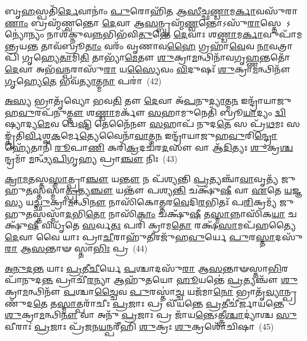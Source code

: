{\anuvakamend[{\-\ul{𑌮}\-\-\ul{𑌨𑍁}\-\-\ul{𑌷𑍍𑌯}\-\-\ul{𑌚}\-𑌰𑌾𑌵𑍁᳴𑌦\-\ul{𑌪𑌾}\-𑌤𑍍𑌰𑌮𑍁᳴\-\ul{𑌪}\-𑌹𑍍𑌵𑌯𑍇᳴𑌤 𑌦𑍍𑌵𑌿𑌦𑍇\-\ul{𑌵}\-𑌤𑍍𑌯𑌾𑌃॑ 𑌷𑌟𑍍𑌚᳴𑌤𑍍𑌵𑌾𑌰𑌿𑍞𑌶𑌚𑍍𑌚}]}%

𑌬𑍃\-\ul{𑌹}\-𑌸𑍍𑌪𑌤𑌿᳴\-\ul{𑌰𑍍𑌦𑍇}\-𑌵𑌾𑌨𑌾𑌂॑ \ul{𑌪𑍁}\-𑌰𑍋𑌹𑌿᳴\-\ul{𑌤} 𑌆\-\ul{𑌸𑍀}\-𑌚𑍍𑌛\-\ul{𑌣𑍍𑌡𑌾}\-𑌮\-\ul{𑌰𑍍𑌕𑌾}\-𑌵𑌸𑍁᳴𑌰𑌾\-\ul{𑌣𑌾𑌂} 𑌬𑍍𑌰𑌹𑍍𑌮᳴𑌣𑍍𑌵𑌨𑍍𑌤𑍋 \ul{𑌦𑍇}\-𑌵𑌾 𑌆\-\ul{𑌸}\-𑌨𑍍𑌬𑍍𑌰𑌹𑍍𑌮᳴\-\ul{𑌣𑍍𑌵}\-𑌨𑍍𑌤𑍋\-𑌽𑌸𑍁᳴\-\ul{𑌰𑌾}\-𑌸𑍍𑌤𑍇 \-𑌽𑌨𑍍𑌯𑍋॑𑌨𑍍𑌯𑌂 𑌨𑌾𑌶᳴𑌕𑍍𑌨𑍁𑌵\-\ul{𑌨𑍍𑌨}\-𑌭𑌿𑌭᳴𑌵𑌿\-\ul{𑌤𑍁}\-𑌨𑍍𑌤𑍇 \ul{𑌦𑍇}\-𑌵𑌾𑌃 𑌶\-\ul{𑌣𑍍𑌡𑌾}\-𑌮\-\ul{𑌰𑍍𑌕𑌾}\-𑌵𑍁𑌪𑌾᳴𑌮𑌨𑍍𑌤𑍍𑌰𑌯\-\ul{𑌨𑍍𑌤} 𑌤𑌾𑌵᳴𑌬𑍍𑌰𑍂\-\ul{𑌤𑌾𑌂} 𑌵𑌰𑌂᳴ 𑌵𑍃𑌣𑌾𑌵\-\ul{𑌹𑍈} 𑌗𑍍𑌰𑌹𑌾᳴\-\ul{𑌵𑍇}\-𑌵 \ul{𑌨𑌾}\-𑌵𑌤𑍍𑌰𑌾𑌪𑌿᳴ 𑌗𑍃𑌹𑍍𑌯𑍇\-\ul{𑌤𑌾}\-𑌮𑌿\-\ul{𑌤𑌿} 𑌤𑌾𑌭𑍍𑌯𑌾᳴\-\ul{𑌮𑍇}\-𑌤𑍗 \ul{𑌶𑍁}\-𑌕𑍍𑌰𑌾\-\ul{𑌮}\-𑌨𑍍𑌥𑌿𑌨𑌾᳴𑌵𑌗𑍃\-\ul{𑌹𑍍𑌣}\-𑌨𑍍𑌤𑌤𑍋᳴ \ul{𑌦𑍇}\-𑌵𑌾 𑌅𑌭᳴\-\ul{𑌵}\-𑌨𑍍𑌪𑌰𑌾𑌸𑍁᳴\-\ul{𑌰𑌾} 𑌯\-\ul{𑌸𑍍𑌯𑍈}\-𑌵𑌂 \ul{𑌵𑌿}\-𑌦𑍁𑌷𑌃᳴ \ul{𑌶𑍁}\-𑌕𑍍𑌰𑌾\-\ul{𑌮}\-𑌨𑍍𑌥𑌿𑌨𑍗᳴ \ul{𑌗𑍃}\-𑌹𑍍𑌯𑍇\-\ul{𑌤𑍇} 𑌭𑌵᳴\-\ul{𑌤𑍍𑌯𑌾}\-𑌤𑍍𑌮\-\ul{𑌨𑌾} 𑌪𑌰𑌾॑~(42)

\-\ul{𑌅}\-\-\ul{𑌸𑍍𑌯} 𑌭𑍍𑌰𑌾𑌤𑍃᳴𑌵𑍍𑌯𑍋 𑌭𑌵\-\ul{𑌤𑌿} 𑌤𑍗 \ul{𑌦𑍇}\-𑌵𑌾 𑌅᳴\-\ul{𑌪}\-𑌨𑍁\-\ul{𑌦𑍍𑌯𑌾}\-𑌤𑍍𑌮\-\ul{𑌨} 𑌇𑌨𑍍𑌦𑍍𑌰𑌾᳴𑌯𑌾𑌜𑍁𑌹\-\ul{𑌵𑍁}\-𑌰𑌪᳴𑌨𑍁\-\ul{𑌤𑍍𑌤𑍗} 𑌶\-\ul{𑌣𑍍𑌡𑌾}\-𑌮𑌰𑍍𑌕𑍗᳴ \ul{𑌸}\-𑌹𑌾𑌮𑍁𑌨𑍇𑌤𑌿᳴ 𑌬𑍍𑌰𑍂\-\ul{𑌯𑌾}\-𑌦𑍍𑌯𑌂 \ul{𑌦𑍍𑌵𑌿}\-𑌷𑍍𑌯𑌾𑌦𑍍𑌯\-\ul{𑌮𑍇}\-𑌵 𑌦𑍍𑌵𑍇\-\ul{𑌷𑍍𑌟𑌿} 𑌤𑍇𑌨𑍈᳴𑌨𑍗 \ul{𑌸}\-𑌹𑌾𑌪᳴ 𑌨𑍁𑌦\-\ul{𑌤𑍇} 𑌸 𑌪𑍍𑌰᳴\-\ul{𑌥}\-𑌮𑌃 𑌸𑌙𑍍𑌕𑍃᳴𑌤𑌿\-\ul{𑌰𑍍𑌵𑌿}\-𑌶𑍍𑌵\-\ul{𑌕}\-𑌰𑍍𑌮𑍇\-\ul{𑌤𑍍𑌯𑍇}\-𑌵𑍈𑌨𑌾᳴\-\ul{𑌵𑌾}\-𑌤𑍍𑌮\-\ul{𑌨} 𑌇𑌨𑍍𑌦𑍍𑌰𑌾᳴𑌯𑌾𑌜𑍁𑌹\-\ul{𑌵𑍁}\-𑌰𑌿\-\ul{𑌨𑍍𑌦𑍍𑌰𑍋} 𑌹𑍍𑌯𑍇᳴𑌤𑌾𑌨𑌿᳴ \ul{𑌰𑍂}\-𑌪𑌾\-\ul{𑌣𑌿} 𑌕𑌰𑌿᳴\-\ul{𑌕𑍍𑌰}\-𑌦𑌚᳴𑌰\-\ul{𑌦}\-𑌸𑍗 𑌵𑌾 𑌆᳴\-\ul{𑌦𑌿}\-𑌤𑍍𑌯𑌃 \ul{𑌶𑍁}\-𑌕𑍍𑌰\-\ul{𑌶𑍍𑌚}\-𑌨𑍍𑌦𑍍𑌰𑌮𑌾᳴ \ul{𑌮}\-𑌨𑍍𑌥𑍍𑌯᳴\-\ul{𑌪𑌿}\-𑌗𑍃\-\ul{𑌹𑍍𑌯} 𑌪𑍍𑌰𑌾\-\ul{𑌞𑍍𑌚𑍗} 𑌨𑌿𑌃~(43)

\-\ul{𑌕𑍍𑌰𑌾}\-\-\ul{𑌮}\-\-\ul{𑌤}\-𑌸𑍍𑌤\-\ul{𑌸𑍍𑌮𑌾}\-𑌤𑍍𑌪𑍍𑌰𑌾\-\ul{𑌞𑍍𑌚𑍗} 𑌯\-\ul{𑌨𑍍𑌤𑍗} 𑌨 𑌪᳴𑌶𑍍𑌯𑌨𑍍𑌤𑌿 \ul{𑌪𑍍𑌰}\-𑌤𑍍𑌯𑌞𑍍𑌚𑌾᳴\-\ul{𑌵𑌾}\-𑌵𑍃𑌤𑍍𑌯᳴ 𑌜𑍁𑌹𑍁\-\ul{𑌤}\-𑌸𑍍𑌤𑌸𑍍𑌮𑌾॑\-\ul{𑌤𑍍𑌪𑍍𑌰}\-𑌤𑍍𑌯\-\ul{𑌞𑍍𑌚𑍗} 𑌯𑌨𑍍𑌤𑍗᳴ 𑌪𑌶𑍍𑌯\-\ul{𑌨𑍍𑌤𑌿} 𑌚𑌕𑍍𑌷𑍁᳴\-\ul{𑌷𑍀} 𑌵𑌾 \ul{𑌏}\-𑌤𑍇 \ul{𑌯}\-𑌜𑍍𑌞\-\ul{𑌸𑍍𑌯} 𑌯\-\ul{𑌚𑍍𑌛𑍁}\-𑌕𑍍𑌰𑌾\-\ul{𑌮}\-𑌨𑍍𑌥𑌿\-\ul{𑌨𑍗} 𑌨𑌾𑌸𑌿᳴𑌕𑍋𑌤𑍍𑌤𑌰\-\ul{𑌵𑍇}\-𑌦𑌿\-\ul{𑌰}\-𑌭𑌿𑌤𑌃᳴ 𑌪\-\ul{𑌰𑌿}\-𑌕𑍍𑌰𑌮𑍍𑌯᳴ 𑌜𑍁𑌹𑍁\-\ul{𑌤}\-𑌸𑍍𑌤𑌸𑍍𑌮𑌾᳴\-\ul{𑌦}\-𑌭𑌿\-\ul{𑌤𑍋} 𑌨𑌾𑌸𑌿᳴\-\ul{𑌕𑌾𑌂} 𑌚𑌕𑍍𑌷𑍁᳴\-\ul{𑌷𑍀} 𑌤\-\ul{𑌸𑍍𑌮𑌾}\-𑌨𑍍𑌨𑌾𑌸𑌿᳴𑌕\-\ul{𑌯𑌾} 𑌚𑌕𑍍𑌷𑍁᳴\-\ul{𑌷𑍀} 𑌵𑌿𑌧𑍃᳴𑌤𑍇 \ul{𑌸}\-𑌰𑍍𑌵\-\ul{𑌤𑌃} 𑌪𑌰𑌿᳴ 𑌕𑍍𑌰𑌾𑌮\-\ul{𑌤𑍋} 𑌰𑌕𑍍𑌷᳴\-\ul{𑌸𑌾}\-𑌮𑌪᳴𑌹𑌤𑍍𑌯𑍈 \ul{𑌦𑍇}\-𑌵𑌾 𑌵𑍈 𑌯𑌾𑌃 𑌪𑍍𑌰𑌾\-\ul{𑌚𑍀}\-𑌰𑌾𑌹𑍁᳴\-\ul{𑌤𑍀}\-𑌰𑌜𑍁᳴𑌹\-\ul{𑌵𑍁}\-𑌰𑍍𑌯𑍇 \ul{𑌪𑍁}\-𑌰\-\ul{𑌸𑍍𑌤𑌾}\-𑌦𑌸𑍁᳴\-\ul{𑌰𑌾} 𑌆\-\ul{𑌸}\-𑌨𑍍𑌤𑌾𑍟 𑌸𑍍𑌤𑌾\-\ul{𑌭𑌿𑌃} 𑌪𑍍𑌰~(44)

\-\ul{𑌅}\-\-\ul{𑌨𑍁}\-\-\ul{𑌦}\-\-\ul{𑌨𑍍𑌤} 𑌯𑌾𑌃 \ul{𑌪𑍍𑌰}\-𑌤𑍀\-\ul{𑌚𑍀}\-𑌰𑍍𑌯𑍇 \ul{𑌪}\-𑌶𑍍𑌚𑌾𑌦𑌸𑍁᳴\-\ul{𑌰𑌾} 𑌆\-\ul{𑌸}\-𑌨𑍍𑌤𑌾𑍟𑌸𑍍𑌤𑌾\-\ul{𑌭𑌿}\-𑌰𑌪𑌾᳴𑌨𑍁𑌦\-\ul{𑌨𑍍𑌤} 𑌪𑍍𑌰𑌾𑌚𑍀᳴\-\ul{𑌰}\-𑌨𑍍𑌯𑌾 𑌆𑌹𑍁᳴𑌤𑌯𑍋 \ul{𑌹𑍂}\-𑌯𑌨𑍍𑌤𑍇॑ \ul{𑌪𑍍𑌰}\-𑌤𑍍𑌯𑌞𑍍𑌚𑍗᳴ \ul{𑌶𑍁}\-𑌕𑍍𑌰𑌾\-\ul{𑌮}\-𑌨𑍍𑌥𑌿𑌨𑍗᳴ \ul{𑌪}\-𑌶𑍍𑌚𑌾\-\ul{𑌚𑍍𑌚𑍈}\-𑌵 \ul{𑌪𑍁}\-𑌰𑌸𑍍𑌤𑌾॑\-\ul{𑌚𑍍𑌚} 𑌯𑌜᳴𑌮𑌾\-\ul{𑌨𑍋} 𑌭𑍍𑌰𑌾𑌤𑍃᳴\-\ul{𑌵𑍍𑌯𑌾}\-𑌨𑍍𑌪𑍍𑌰 𑌣𑍁᳴𑌦\-\ul{𑌤𑍇} 𑌤\-\ul{𑌸𑍍𑌮𑌾}\-𑌤𑍍𑌪𑌰𑌾᳴𑌚𑍀𑌃 \ul{𑌪𑍍𑌰}\-𑌜𑌾𑌃 𑌪𑍍𑌰 𑌵𑍀᳴𑌯𑌨𑍍𑌤𑍇 \ul{𑌪𑍍𑌰}\-𑌤𑍀𑌚𑍀॑𑌰𑍍𑌜𑌾𑌯𑌨𑍍𑌤𑍇 \ul{𑌶𑍁}\-𑌕𑍍𑌰𑌾\-\ul{𑌮}\-𑌨𑍍𑌥𑌿\-\ul{𑌨𑍗} 𑌵𑌾 𑌅𑌨𑍁᳴ \ul{𑌪𑍍𑌰}\-𑌜𑌾𑌃 𑌪𑍍𑌰 𑌜𑌾᳴𑌯\-\ul{𑌨𑍍𑌤𑍇}\-\-𑌽𑌤𑍍𑌤𑍍𑌰𑍀\-\ul{𑌶𑍍𑌚𑌾}\-𑌦𑍍𑌯𑌾॑𑌶𑍍𑌚 \ul{𑌸𑍁}\-𑌵𑍀𑌰𑌾𑌃॑ \ul{𑌪𑍍𑌰}\-𑌜𑌾𑌃 𑌪𑍍𑌰᳴\-\ul{𑌜}\-𑌨\-\ul{𑌯}\-𑌨𑍍𑌪𑌰𑍀᳴𑌹𑌿 \ul{𑌶𑍁}\-𑌕𑍍𑌰𑌃 \ul{𑌶𑍁}\-𑌕𑍍𑌰𑌶𑍋᳴𑌚𑌿𑌷𑌾~(45)


